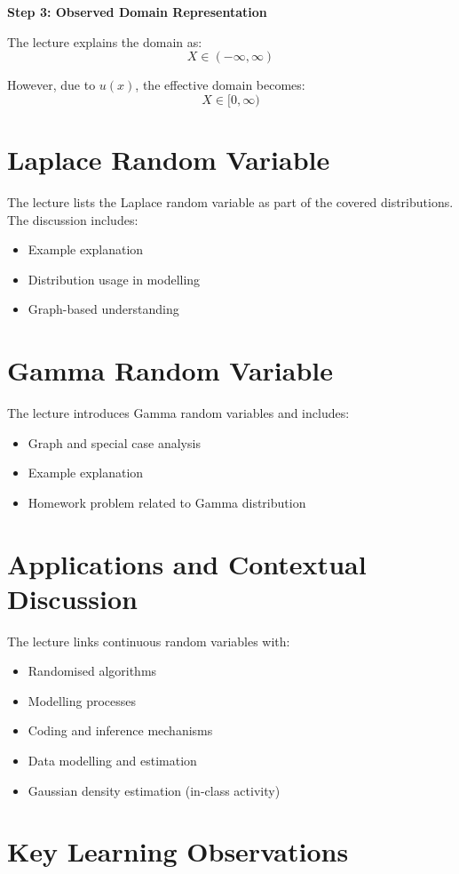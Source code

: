 \documentclass[12pt]{article}
\begin{document}
\textbf{Step 3: Observed Domain Representation}

The lecture explains the domain as:
\[
X \in (-\infty, \infty)
\]

However, due to $u(x)$, the effective domain becomes:
\[
X \in [0, \infty)
\]

\section{Laplace Random Variable}
The lecture lists the Laplace random variable as part of the covered distributions. The discussion includes:

\begin{itemize}
\item Example explanation
\item Distribution usage in modelling
\item Graph-based understanding
\end{itemize}

\section{Gamma Random Variable}
The lecture introduces Gamma random variables and includes:

\begin{itemize}
\item Graph and special case analysis
\item Example explanation
\item Homework problem related to Gamma distribution
\end{itemize}

\section{Applications and Contextual Discussion}
The lecture links continuous random variables with:

\begin{itemize}
\item Randomised algorithms
\item Modelling processes
\item Coding and inference mechanisms
\item Data modelling and estimation
\item Gaussian density estimation (in-class activity)
\end{itemize}

\section{Key Learning Observations}
\end{document}
